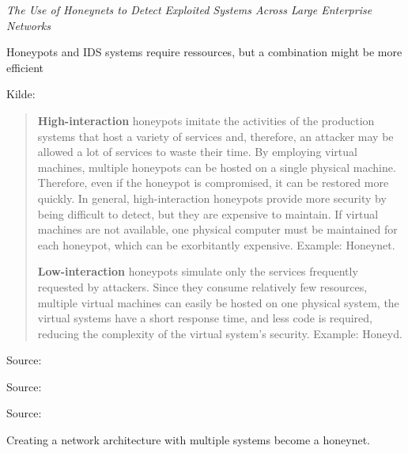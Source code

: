 \documentclass[Screen16to9,17pt]{foils}
\begin{document}
\begin{list1}
\item \emph{The Use of Honeynets to Detect Exploited Systems
Across Large Enterprise Networks}
\item Honeypots and IDS systems require ressources, but a combination might be more efficient
\item Kilde: {\small
{}}
\end{list1}




\begin{quote}
{\bf High-interaction} honeypots imitate the activities of the production systems that host a variety of services and, therefore, an attacker may be allowed a lot of services to waste their time. By employing virtual machines, multiple honeypots can be hosted on a single physical machine. Therefore, even if the honeypot is compromised, it can be restored more quickly. In general, high-interaction honeypots provide more security by being difficult to detect, but they are expensive to maintain. If virtual machines are not available, one physical computer must be maintained for each honeypot, which can be exorbitantly expensive. Example: Honeynet.

{\bf Low-interaction} honeypots simulate only the services frequently requested by attackers. Since they consume relatively few resources, multiple virtual machines can easily be hosted on one physical system, the virtual systems have a short response time, and less code is required, reducing the complexity of the virtual system's security. Example: Honeyd.
\end{quote}
Source: 

Source:


Source: 

Creating a network architecture with multiple systems become a honeynet.

\end{document}
